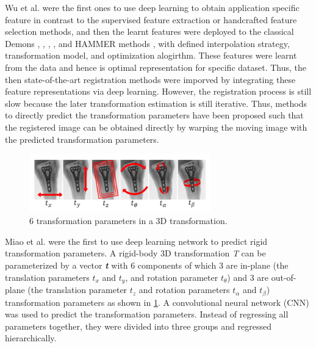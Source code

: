\documentclass{book}
\begin{document}
	Wu et al. \cite{7314894} \cite{Wu} were the first ones to use deep learning to obtain application specific feature in contrast to the supervised feature extraction or handcrafted feature selection methods, and then the learnt features were deployed to the classical Demons \cite{VERCAUTEREN2009S61}, \cite{10.1007/10704282_64}, \cite{10.1007/978-3-540-85990-1_117}, \cite{10.1007/978-3-642-24446-9_3}, \cite{Peyrat} and HAMMER methods \cite{Wu2010TPSHAMMERIH}, \cite{Shen} with defined interpolation strategy, transformation model, and optimization alogirthm. These features were learnt from the data and hence is optimal representation for specific dataset. Thus, the then state-of-the-art registration methods were imporved by integrating these feature representations via deep learning. However, the registration process is still slow because the later transformation estimation is still iterative. Thus, methods to directly predict the transformation parameters have been proposed such that the registered image can be obtained directly by warping the moving image with the predicted transformation parameters.
	
	\begin{figure}[h!]
	\centering
	\includegraphics[width=0.7\textwidth]{resources/chapter2/tx_parameters.png}
	\caption{6 transformation parameters in a 3D transformation. \cite{7393571}}
	\label{fig:tx_parameters}
	\end{figure}
	
	
	Miao et al. \cite{7393571} were the first to use deep learning network to predict rigid transformation parameters. A rigid-body 3D transformation \emph{T} can be parameterized by a vector \emph{\textbf{t}} with 6 components of which 3 are in-plane (the translation parameters \emph{\textbf{$t_x$}} and \emph{\textbf{$t_y$}}, and rotation parameter \emph{\textbf{$t_\theta$}}) and 3 are out-of-plane (the translation parameter \emph{\textbf{$t_z$}} and rotation parameters \emph{\textbf{$t_\alpha$}} and \emph{\textbf{$t_\beta$}}) transformation parameters as shown in \ref{fig:tx_parameters}. A convolutional neural network (CNN) was used to predict the transformation parameters. Instead of regressing all parameters together, they were divided into three groups and regressed hierarchically.
	
\end{document}
